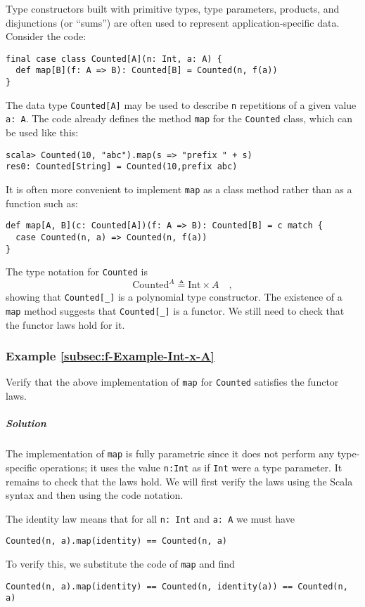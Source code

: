 Type constructors built
with primitive types, type parameters, products, and disjunctions
(or \textsf{``}sums\textsf{''}) are often used to represent application-specific data.
Consider the code:
\begin{lstlisting}
final case class Counted[A](n: Int, a: A) {
  def map[B](f: A => B): Counted[B] = Counted(n, f(a))
}
\end{lstlisting}
The data type \lstinline!Counted[A]! may be used to describe \lstinline!n!
repetitions of a given value \lstinline!a: A!. The code already defines
the  method \lstinline!map! for the \lstinline!Counted! class, which
can be used like this:
\begin{lstlisting}
scala> Counted(10, "abc").map(s => "prefix " + s)
res0: Counted[String] = Counted(10,prefix abc) 
\end{lstlisting}
It is often more convenient to implement \lstinline!map! as a class
method rather than as a function such as:
\begin{lstlisting}
def map[A, B](c: Counted[A])(f: A => B): Counted[B] = c match {
  case Counted(n, a) => Counted(n, f(a))
}
\end{lstlisting}

The type notation for \lstinline!Counted! is
\[
\text{Counted}^{A}\triangleq\text{Int}\times A\quad,
\]
showing that \lstinline!Counted[_]! is a polynomial type constructor.
The existence of a \lstinline!map! method suggests that \lstinline!Counted[_]!
is a functor. We still need to check that the functor laws hold for
it.

\subsubsection{Example \label{subsec:f-Example-Int-x-A}\ref{subsec:f-Example-Int-x-A}}

Verify that the above implementation of \lstinline!map! for \lstinline!Counted!
satisfies the functor laws. 

\subparagraph{Solution}

The implementation of \lstinline!map! is fully parametric since it
does not perform any type-specific operations; it uses the value \lstinline!n:Int!
as if \lstinline!Int! were a type parameter. It remains to check
that the laws hold. We will first verify the laws using the Scala
syntax and then using the code notation.

The identity law means that for all \lstinline!n: Int! and \lstinline!a: A!
we must have
\begin{lstlisting}
Counted(n, a).map(identity) == Counted(n, a)
\end{lstlisting}
To verify this, we substitute the code of \lstinline!map! and find
\begin{lstlisting}
Counted(n, a).map(identity) == Counted(n, identity(a)) == Counted(n, a)
\end{lstlisting}


